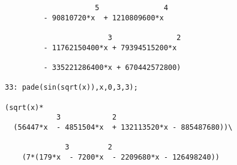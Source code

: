 \begin{verbatim}
                     5               4
         - 90810720*x  + 1210809600*x

                        3               2
         - 11762150400*x + 79394515200*x

         - 335221286400*x + 670442572800)

33: pade(sin(sqrt(x)),x,0,3,3);

(sqrt(x)*
            3            2
  (56447*x  - 4851504*x  + 132113520*x - 885487680))\

              3         2
    (7*(179*x  - 7200*x  - 2209680*x - 126498240))
\end{verbatim}
